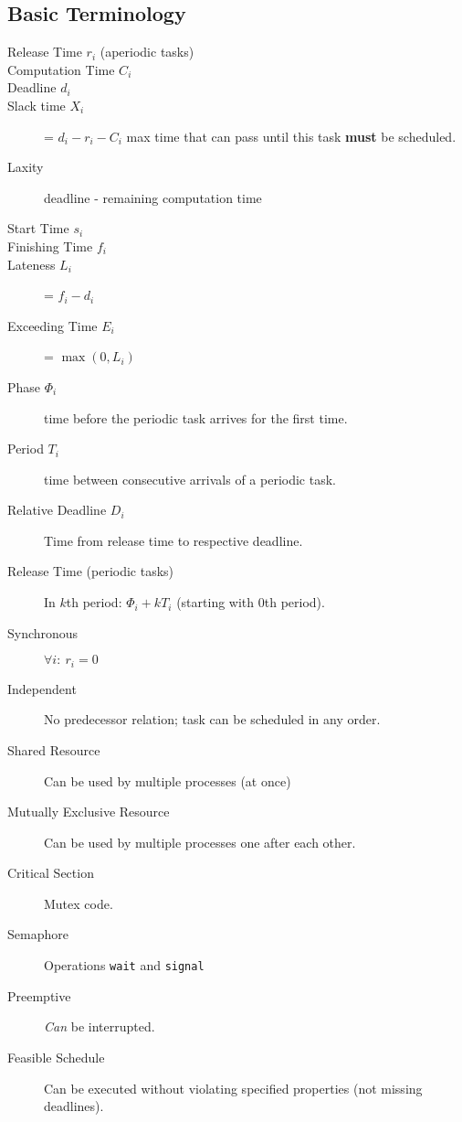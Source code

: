 \subsection*{Basic Terminology}
\begin{description}
	\item[Release Time $r_i$ (aperiodic tasks)]
	\item[Computation Time $C_i$]
	\item[Deadline $d_i$]
	\item[Slack time $X_i$] = $d_i - r_i - C_i$ max time that can pass until
	this task \textbf{must} be scheduled.
	\item[Laxity] deadline - remaining computation time
	\item[Start Time $s_i$]
	\item[Finishing Time $f_i$]
	\item[Lateness $L_i$] = $f_i - d_i$
	\item[Exceeding Time $E_i$] = $\max(0, L_i)$
	\item[Phase $\Phi_i$] time before the periodic task arrives for the first
	time.
	\item[Period $T_i$] time between consecutive arrivals of a periodic task.
	\item[Relative Deadline $D_i$] Time from release time to respective deadline.
	\item[Release Time (periodic tasks)] In $k$th period: $\Phi_i + k T_i$
	(starting with 0th period).
	\item[Synchronous] $\forall i: \ r_i = 0$
	\item[Independent] No predecessor relation; task can be scheduled in any
	order.
	\item[Shared Resource] Can be used by multiple processes (at once)
	\item[Mutually Exclusive Resource]Can be used by multiple processes one
	after each other.
	\item[Critical Section] Mutex code.
	\item[Semaphore] Operations \texttt{wait} and \texttt{signal}
	\item[Preemptive] \textit{Can} be interrupted.
	\item[Feasible Schedule] Can be executed without violating specified
	properties (\eg not missing deadlines).
\end{description}

